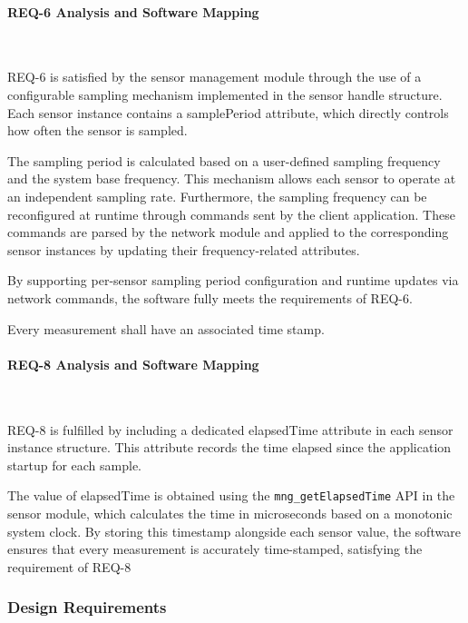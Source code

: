 \documentclass{article}
\begin{document}
\paragraph{REQ-6 Analysis and Software Mapping}\

REQ-6 is satisfied by the sensor management module through the use of a configurable 
sampling mechanism implemented in the sensor handle structure. Each sensor instance 
contains a samplePeriod attribute, which directly controls how often the sensor is 
sampled.

The sampling period is calculated based on a user-defined sampling frequency and 
the system base frequency. This mechanism allows each sensor to operate at an 
independent sampling rate. Furthermore, the sampling frequency can be reconfigured 
at runtime through commands sent by the client application. These commands are 
parsed by the network module and applied to the corresponding sensor instances by 
updating their frequency-related attributes.

By supporting per-sensor sampling period configuration and runtime updates via 
network commands, the software fully meets the requirements of REQ-6.

\begin{tcolorbox}[
    title=REQ-8,
    colback=gray!5,
    colframe=black,
    fonttitle=\bfseries
]
Every measurement shall have an associated time stamp.
\end{tcolorbox}

\paragraph{REQ-8 Analysis and Software Mapping}\

REQ-8 is fulfilled by including a dedicated elapsedTime attribute in each 
sensor instance structure. This attribute records the time elapsed since the 
application startup for each sample.

The value of elapsedTime is obtained using the \texttt{mng\_getElapsedTime}  API in the sensor 
module, which calculates the time in microseconds based on a monotonic system clock. 
By storing this timestamp alongside each sensor value, the software ensures that 
every measurement is accurately time-stamped, satisfying the requirement of REQ-8


\subsubsection{Design Requirements}
\end{document}
